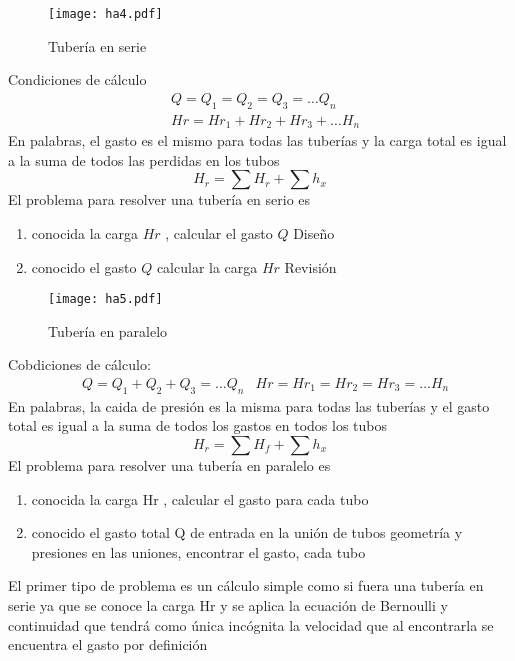 \begin{figure}[h!]
\centering
  \texttt{[image: ha4.pdf]}
  \caption{Tubería en serie}
  \label{ha4}
\end{figure}
Condiciones de cálculo
\begin{align*}
    &Q = Q_1 = Q_2 = Q_3 = \dots Q_n\\
    &Hr = Hr_1 + Hr_2 + Hr_3 + \dots H_n 
\end{align*}
En palabras, el gasto es el mismo para todas las tuberías y la carga total es igual a la suma de todos las perdidas en los tubos
\begin{equation}
    H_r = \sum H_r + \sum h_x
\end{equation}
El problema para resolver una tubería en serio es
\begin{enumerate}
    \item conocida la carga $Hr$ , calcular el gasto $Q$ Diseño
    \item conocido el gasto $Q$ calcular la carga $Hr$ Revisión    
\end{enumerate}
\begin{figure}[h!]
\centering
  \texttt{[image: ha5.pdf]}
  \caption{Tubería en paralelo}
  \label{ha5}
\end{figure}
Cobdiciones de cálculo:
\begin{align*}
    &Q = Q_1 + Q_2 + Q_3 = \dots Q_n
    &Hr = Hr_1 =  Hr_2 = Hr_3 = \dots H_n
\end{align*}
En palabras, la caida de presión es la misma para todas las tuberías y el gasto total es
igual a la suma de todos los gastos en todos los tubos
\begin{equation}
    H_r = \sum H_f + \sum h_x
\end{equation}
El problema para resolver una tubería en paralelo es
\begin{enumerate}
    \item conocida la carga Hr , calcular el gasto para cada tubo
    \item conocido el gasto total Q de entrada en la unión de tubos geometría y presiones en las uniones, encontrar el gasto, cada tubo
\end{enumerate}

El primer tipo de problema es un cálculo simple como si fuera una tubería en serie ya que se conoce la carga Hr y se aplica la ecuación de Bernoulli y continuidad que tendrá como única incógnita la velocidad que al encontrarla se encuentra el gasto por definición

